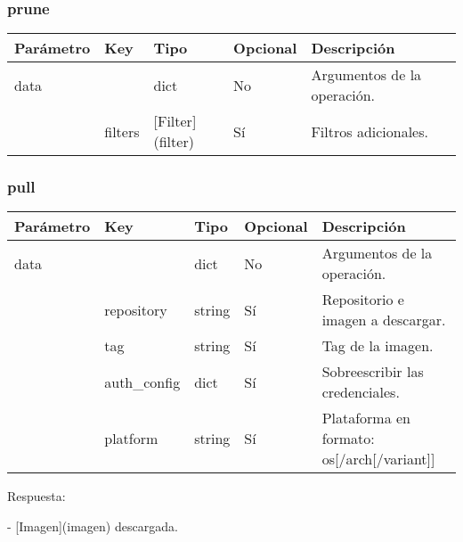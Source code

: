 			\subsubsection{prune}
				\begin{table}[!h]
					\centering
	\begin{adjustbox}{max width=\textwidth}
					\begin{tabular}{|l|l|l|l|l|}
						\hline
						Parámetro & Key & Tipo & Opcional & Descripción \\ \hline
						data &  & dict & No & Argumentos de la operación. \\ \hline
						& filters & [Filter](filter) & Sí & Filtros adicionales. \\ \hline
					\end{tabular}
\end{adjustbox}
				\end{table}
			
			\subsubsection{pull}
				\begin{table}[!h]
					\centering
	\begin{adjustbox}{max width=\textwidth}
					\begin{tabular}{|l|l|l|l|l|}
						\hline
						Parámetro & Key & Tipo & Opcional & Descripción \\ \hline
						data &  & dict & No & Argumentos de la operación. \\ \hline
						& repository & string & Sí & Repositorio e imagen a descargar. \\ \hline
						& tag & string & Sí & Tag de la imagen. \\ \hline
						& auth\_config & dict & Sí & Sobreescribir las credenciales. \\ \hline
						& platform & string & Sí & Plataforma en formato: os[/arch[/variant]] \\ \hline
					\end{tabular}
\end{adjustbox}
				\end{table}
			
				Respuesta:
				
				- [Imagen](imagen) descargada.
				
